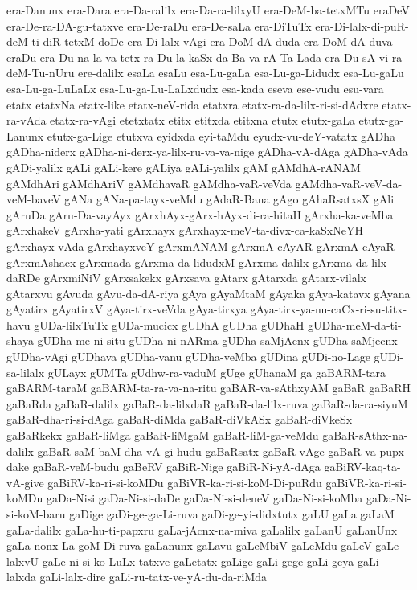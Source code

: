 {era-Danunx
era-Dara
era-Da-ralilx
era-Da-ra-lilxyU
era-DeM-ba-tetxMTu
eraDeV
era-De-ra-DA-gu-tatxve
era-De-raDu
era-De-saLa
era-DiTuTx
era-Di-lalx-di-puR-deM-ti-diR-tetxM-doDe
era-Di-lalx-vAgi
era-DoM-dA-duda
era-DoM-dA-duva
eraDu
era-Du-na-la-va-tetx-ra-Du-la-kaSx-da-Ba-va-rA-Ta-Lada
era-Du-sA-vi-ra-deM-Tu-nUru
ere-dalilx
esaLa
esaLu
esa-Lu-gaLa
esa-Lu-ga-Lidudx
esa-Lu-gaLu
esa-Lu-ga-LuLaLx
esa-Lu-ga-Lu-LaLxdudx
esa-kada
eseva
ese-vudu
esu-vara
etatx
etatxNa
etatx-like
etatx-neV-rida
etatxra
etatx-ra-da-lilx-ri-si-dAdxre
etatx-ra-vAda
etatx-ra-vAgi
etetxtatx
etitx
etitxda
etitxna
etutx
etutx-gaLa
etutx-ga-Lanunx
etutx-ga-Lige
etutxva
eyidxda
eyi-taMdu
eyudx-vu-deY-vatatx
gADha
gADha-niderx
gADha-ni-derx-ya-lilx-ru-va-va-nige
gADha-vA-dAga
gADha-vAda
gADi-yalilx
gALi
gALi-kere
gALiya
gALi-yalilx
gAM
gAMdhA-rANAM
gAMdhAri
gAMdhAriV
gAMdhavaR
gAMdha-vaR-veVda
gAMdha-vaR-veV-da-veM-baveV
gANa
gANa-pa-tayx-veMdu
gAdaR-Bana
gAgo
gAhaRsatxsX
gAli
gAruDa
gAru-Da-vayAyx
gArxhAyx-gArx-hAyx-di-ra-hitaH
gArxha-ka-veMba
gArxhakeV
gArxha-yati
gArxhayx
gArxhayx-meV-ta-divx-ca-kaSxNeYH
gArxhayx-vAda
gArxhayxveY
gArxmANAM
gArxmA-cAyAR
gArxmA-cAyaR
gArxmAshacx
gArxmada
gArxma-da-lidudxM
gArxma-dalilx
gArxma-da-lilx-daRDe
gArxmiNiV
gArxsakekx
gArxsava
gAtarx
gAtarxda
gAtarx-vilalx
gAtarxvu
gAvuda
gAvu-da-dA-riya
gAya
gAyaMtaM
gAyaka
gAya-katavx
gAyana
gAyatirx
gAyatirxV
gAya-tirx-veVda
gAya-tirxya
gAya-tirx-ya-nu-caCx-ri-su-titx-havu
gUDa-lilxTuTx
gUDa-mucicx
gUDhA
gUDha
gUDhaH
gUDha-meM-da-ti-shaya
gUDha-me-ni-situ
gUDha-ni-nARma
gUDha-saMjAcnx
gUDha-saMjecnx
gUDha-vAgi
gUDhava
gUDha-vanu
gUDha-veMba
gUDina
gUDi-no-Lage
gUDi-sa-lilalx
gULayx
gUMTa
gUdhw-ra-vaduM
gUge
gUhanaM
ga
gaBARM-tara
gaBARM-taraM
gaBARM-ta-ra-va-na-ritu
gaBAR-va-sAthxyAM
gaBaR
gaBaRH
gaBaRda
gaBaR-dalilx
gaBaR-da-lilxdaR
gaBaR-da-lilx-ruva
gaBaR-da-ra-siyuM
gaBaR-dha-ri-si-dAga
gaBaR-diMda
gaBaR-diVkASx
gaBaR-diVkeSx
gaBaRkekx
gaBaR-liMga
gaBaR-liMgaM
gaBaR-liM-ga-veMdu
gaBaR-sAthx-na-dalilx
gaBaR-saM-baM-dha-vA-gi-hudu
gaBaRsatx
gaBaR-vAge
gaBaR-va-pupx-dake
gaBaR-veM-budu
gaBeRV
gaBiR-Nige
gaBiR-Ni-yA-dAga
gaBiRV-kaq-ta-vA-give
gaBiRV-ka-ri-si-koMDu
gaBiVR-ka-ri-si-koM-Di-puRdu
gaBiVR-ka-ri-si-koMDu
gaDa-Nisi
gaDa-Ni-si-daDe
gaDa-Ni-si-deneV
gaDa-Ni-si-koMba
gaDa-Ni-si-koM-baru
gaDige
gaDi-ge-ga-Li-ruva
gaDi-ge-yi-didxtutx
gaLU
gaLa
gaLaM
gaLa-dalilx
gaLa-hu-ti-papxru
gaLa-jAcnx-na-miva
gaLalilx
gaLanU
gaLanUnx
gaLa-nonx-La-goM-Di-ruva
gaLanunx
gaLavu
gaLeMbiV
gaLeMdu
gaLeV
gaLe-lalxvU
gaLe-ni-si-ko-LuLx-tatxve
gaLetatx
gaLige
gaLi-gege
gaLi-geya
gaLi-lalxda
gaLi-lalx-dire
gaLi-ru-tatx-ve-yA-du-da-riMda
}
